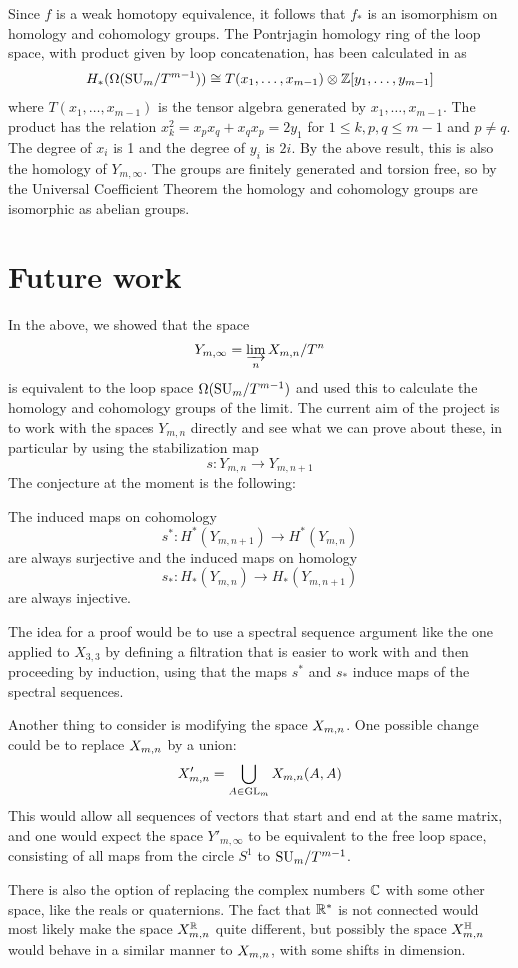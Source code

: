 Since $f$ is a weak homotopy equivalence, it follows that $f_*$ is
an isomorphism on homology and cohomology groups. The Pontrjagin
homology ring of the loop space, with product given by loop
concatenation, has been calculated in \cite[Theorem~4.1]{grbic} as
\begin{align*}
  H_*(\Omega(\mathrm{SU}_{m}/T^{m-1})) \cong T(x_1,\dots,x_{m-1}) \otimes
  \mathbb{Z}[y_1,\dots,y_{m-1}]
\end{align*}
where $T(x_1,\dots,x_{m-1})$ is the tensor algebra generated by
$x_1,\dots,x_{m-1}$. The product has the relation $x_k^2 =
x_px_q+x_qx_p = 2y_1$ for $1\leq k,p,q\leq m-1$ and $p\neq q$. The
degree of $x_i$ is 1 and the degree of $y_i$
is $2i$. By the above result, this is also the homology of
$Y_{m,\infty}$. The groups are finitely generated and torsion free, so
by the Universal Coefficient Theorem the homology and cohomology
groups are isomorphic as abelian groups.


\section{Future work}

In the above, we showed that the space 
\[ Y_{m,\infty} = \varinjlim_n X_{m,n}/T^n \]
is equivalent to the loop space $\Omega(\mathrm{SU}_{m}/T^{m-1})$ and used this to
calculate the homology and cohomology groups of the limit. The
current aim of the project is to work with the spaces $Y_{m,n}$
directly and see what we can prove about these, in particular by using
the stabilization map
\[ s : Y_{m,n} \to Y_{m,n+1} \]
The conjecture at the moment is the following:
\begin{conjecture}
  The induced maps on cohomology
  \[ s^* : H^*(Y_{m,n+1}) \to H^*(Y_{m,n}) \]
  are always surjective and the induced maps on homology
  \[ s_* : H_*(Y_{m,n}) \to H_*(Y_{m,n+1}) \]
  are always injective.
\end{conjecture}
The idea for a proof would be to use a spectral sequence argument like
the one applied to $X_{3,3}$ by defining a filtration that is easier
to work with and then proceeding by induction, using that the maps
$s^*$ and $s_*$ induce maps of the spectral sequences.

Another thing to consider is modifying the space $X_{m,n}$. One possible
change could be to replace $X_{m,n}$ by a union:
\[ X'_{m,n} = \bigcup_{A\in\mathrm{GL}_m} X_{m,n}(A,A) \]
This would allow all sequences of vectors that start and end at the
same matrix, and one would expect the space $Y'_{m,\infty}$ to be
equivalent to the free loop space, consisting of all
maps from the circle $S^1$ to $\mathrm{SU}_{m}/T^{m-1}$.

There is also the option of replacing the complex numbers $\mathbb{C}$ with
some other space, like the reals or quaternions. The fact that $\mathbb{R}^*$
is not connected would most likely make the space $X_{m,n}^{\mathbb{R}}$ quite
different, but possibly the space $X_{m,n}^{\mathbb{H}}$ would behave in a
similar manner to $X_{m,n}$, with some shifts in dimension.


